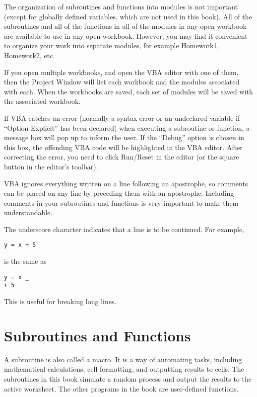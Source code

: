 The organization of subroutines and functions into modules is not important (except for globally defined variables, which are not used in this book).  All of the subroutines and all of the functions in all of the modules in any open workbook are available to use in any open workbook.  However, you may find it convenient to organize your work into separate modules, for example Homework1, Homework2, etc. 

If you open multiple workbooks, and open the VBA editor with one of them, then the Project Window will list each workbook and the modules associated with each.  When the workbooks are saved, each set of modules will be saved with the associated workbook.  

If VBA catches an error (normally a syntax error or an undeclared variable if ``Option Explicit'' has been declared) when executing a subroutine or function, a message box will pop up to inform the user.  If the ``Debug'' option is chosen in this box, the offending VBA code will be highlighted in the VBA editor.  After correcting the error, you need to click Run/Reset in the editor (or the square button in the editor's toolbar).

VBA ignores everything written on a line following an apostrophe, so comments can be placed on any line by preceding them with an apostrophe.  Including comments in your subroutines and functions is very important to make them understandable.  

The underscore character indicates that a line is to be continued.  For example, 
\small\begin{verbatim}
y = x + 5
\end{verbatim}\normalsize
is the same as
\small\begin{verbatim}
y = x _
+ 5
\end{verbatim}\normalsize
This is useful for breaking long lines.
\section{Subroutines and Functions}

A subroutine is also called a macro.  It is a way of automating tasks, including mathematical calculations, cell formatting, and outputting results to cells.  The subroutines in  this book simulate a random process and output the results to the active worksheet.  The other programs in the book are user-defined functions.  

